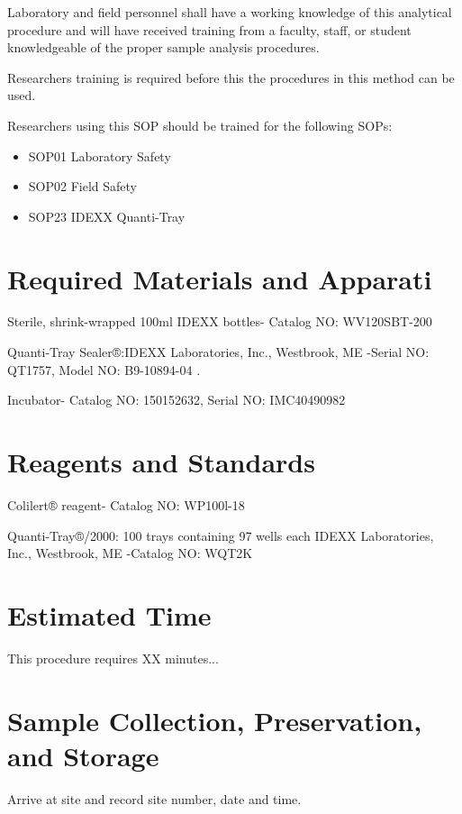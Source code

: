 \documentclass[12pt]{../SOP4_alpha}\usepackage[]{graphicx}\usepackage[]{xcolor}
\begin{document}
\NP Laboratory and field personnel shall have a working knowledge of this analytical procedure and will have received training from a faculty, staff, or student knowledgeable of the proper sample analysis procedures. 

\NP Researchers training is required before this the procedures in this method can be used.

\NP Researchers using this SOP should be trained for the following SOPs:

\begin{itemize}
  \item SOP01 Laboratory Safety
  \item SOP02 Field Safety
  \item SOP23 IDEXX Quanti-Tray
\end{itemize}

\section{Required Materials and Apparati}

 Sterile, shrink-wrapped 100ml IDEXX bottles- Catalog NO: WV120SBT-200


\NP Quanti-Tray Sealer®:IDEXX Laboratories, Inc., Westbrook, ME -Serial NO: QT1757, Model NO: B9-10894-04
.

\NP Incubator- Catalog NO: 150152632, Serial NO: IMC40490982


\section{Reagents and Standards}

\NP Colilert® reagent- Catalog NO: WP100l-18

\NP Quanti-Tray®/2000: 100 trays containing 97 wells each IDEXX Laboratories, Inc., Westbrook, ME -Catalog NO: WQT2K

\section{Estimated Time}

\NP This procedure requires XX minutes...

\section{Sample Collection, Preservation, and Storage}

\NP  Arrive at site and record site number, date and time.
\end{document}
